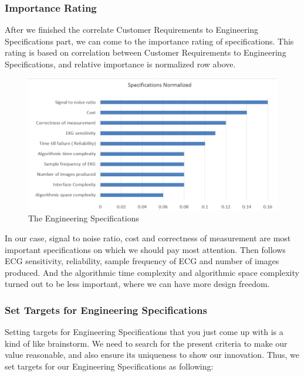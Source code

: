 \documentclass[paper=letter, fontsize=11pt]{scrartcl}
\numberwithin{equation}{section}		%
\numberwithin{figure}{section}			%
\numberwithin{table}{section}			%
\begin{document}
\subsubsection{Importance Rating}
After we finished the correlate Customer Requirements to Engineering Specifications part, we can come to the importance rating of specifications. This rating is based on correlation between Customer Requirements to Engineering Specifications, and relative importance is normalized row above. 

\begin{figure}[H]
    \centering
	\includegraphics[scale=0.7]{engineering_specifications.png}
	\caption{The Engineering Specifications}
\end{figure}

In our case, signal to noise ratio, cost and correctness of measurement are most important specifications on which we should pay most attention. Then follows ECG sensitivity, reliability, sample frequency of ECG and number of images produced. And the algorithmic time complexity and algorithmic space complexity turned out to be less important, where we can have more design freedom.
\subsubsection{Set Targets for Engineering Specifications}
Setting targets for Engineering Specifications that you just come up with is a kind of like brainstorm. We need to search for the present criteria to make our value reasonable, and also ensure its uniqueness to show our innovation. Thus, we set targets for our Engineering Specifications as following:
\end{document}

